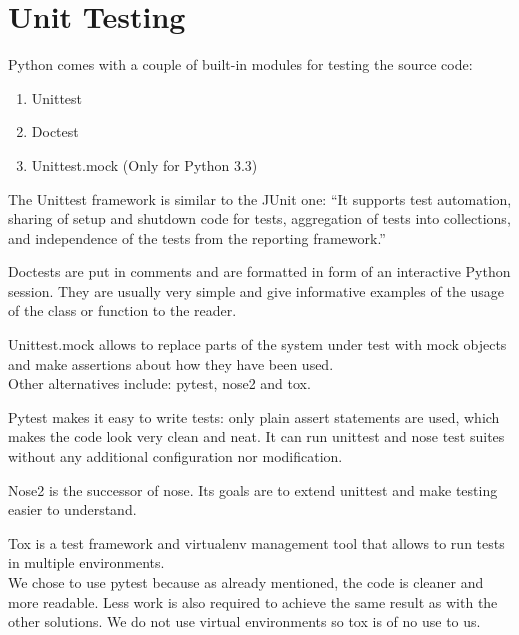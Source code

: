 \section{Unit Testing}

Python comes with a couple of built-in modules for testing the source code:

\begin{enumerate}
    \item Unittest
    \item Doctest
    \item Unittest.mock (Only for Python 3.3)
\end{enumerate}

The Unittest framework is similar to the JUnit one: ``It supports test
automation, sharing of setup and shutdown code for tests, aggregation of tests
into collections, and independence of the tests from the reporting
framework.''~\cite{pythondoc361unittest}

Doctests are put in comments and are formatted in form of an interactive Python
session. They are usually very simple and give informative examples of the usage
of the class or function to the reader.~\cite{python361doctest}

Unittest.mock allows to replace parts of the system under test with mock objects
and make assertions about how they have been used.~\cite{pythondoc370mock}
\\

Other alternatives include: pytest, nose2 and tox.

Pytest makes it easy to write tests: only plain assert statements are used,
which makes the code look very clean and neat. It can run unittest and nose test
suites without any additional configuration nor modification.~\cite{pytest}

Nose2 is the successor of nose. Its goals are to extend unittest and make
testing easier to understand.~\cite{nose2VSnose}

Tox is a test framework and virtualenv management tool that allows to run tests
in multiple environments.~\cite{tox270doc}\\

We chose to use pytest because as already mentioned, the code is cleaner and
more readable. Less work is also required to achieve the same result as with the
other solutions. We do not use virtual environments so tox is of no use to us.
